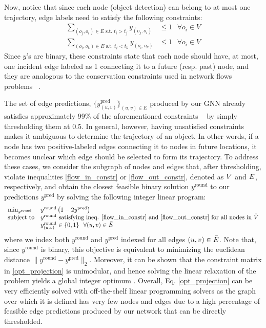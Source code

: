 \documentclass[10pt,twocolumn,letterpaper]{article}
\begin{document}
{{Now, notice that since each node (\ie object detection) can belong to at most one trajectory, edge labels need to satisfy the following constraints:
\begin{align}
 \sum_{(o_j, o_i)\in E \text{ s.t. } t_i>t_j} y_{(o_j, o_i)} &\leq 1 \ \ \ \forall o_i\in V  \label{flow_in_constr} \\
\sum_{(o_i, o_k)\in E \text{ s.t. } t_i<t_k} y_{(o_i, o_k)} &\leq 1 \ \ \ \forall o_i\in V \label{flow_out_constr}
\end{align}
Since $y$'s are binary, these constraints state that each node should have, at most, one incident edge labeled as 1 connecting it to a future (resp. past) node, and they are analogous to the conservation constraints used in network flows problems ~\cite{networkflows}.

 The set of edge predictions, $\{y^{\text{pred}}_{(u, v)}\}_{(u, v)\in E}$ produced by our GNN already satisfies approximately 99\% of the aforementioned constraints ~\cite{mpntrack} by simply thresholding them at 0.5. In general, however,  having unsatisfied constraints makes it ambiguous to determine the trajectory of an object. In other words, if a node has two positive-labeled edges connecting it to nodes in future locations, it becomes unclear which edge should be selected to form its trajectory. To address these cases, we consider the subgraph of nodes and edges that, after thresholding, violate inequalities \ref{flow_in_constr} or \ref{flow_out_constr}, denoted as $\Bar{V}$ and $\Bar{E}$, respectively, and obtain the closest feasible binary solution $y^{\text{round}}$ to our predictions $y^{\text{pred}}$ by solving the following integer linear program:
\begin{align}
\begin{array}{ll@{}ll}
\min_{y^{\text{round}}}  &  y^{\text{round}} \left(1 - 2y^{\text{pred}}\right )      &\\
\text{subject to}& y^{\text{round}} \  \text{satisfying ineq. \ref{flow_in_constr}  and \ref{flow_out_constr} for all nodes in } \Bar{V} &\\                                               &y^{\text{round}}_{(u, v)} \in \{0,1\} \ \  \forall (u, v) \in \bar{E}
\end{array}\label{opt_projection}
\end{align}
where we index both $y^{\text{round}}$ and $y^{\text{pred}}$ indexed for all edges $(u, v)\in \Bar{E}$. Note that, since $y^\text{round}$ is binary, this objective is equivalent to minimizing the euclidean distance $\lVert y^\text{round} - y^\text{pred}\rVert_2$. Moreover, it can be shown that the constraint matrix in \ref{opt_projection} is unimodular, and hence solving the linear relaxation of the problem yields a global integer optimum \cite{berclaz2011multiple}. Overall,  Eq. \ref{opt_projection} can be very efficiently solved with off-the-shelf linear programming solvers as the graph over which it is defined has very few nodes and edges due to a high percentage of feasible edge predictions produced by our network that can be directly thresholded. 



}}
\end{document}
